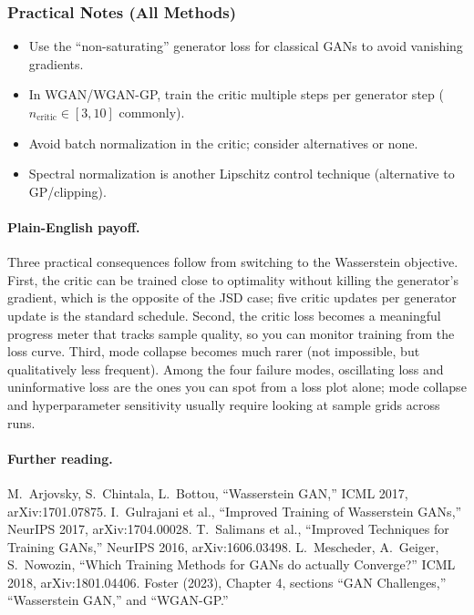 \documentclass[11pt]{article}
\theoremstyle{remark}
\begin{document}
\subsubsection{Practical Notes (All Methods)}
\begin{itemize}
\item Use the ``non-saturating'' generator loss for classical GANs to avoid vanishing gradients.
\item In WGAN/WGAN-GP, train the critic multiple steps per generator step ($n_{\text{critic}}\in[3,10]$ commonly).
\item Avoid batch normalization in the critic; consider alternatives or none.
\item Spectral normalization is another Lipschitz control technique (alternative to GP/clipping).
\end{itemize}

\paragraph{Plain-English payoff.}
Three practical consequences follow from switching to the Wasserstein objective. First, the critic can be trained close to optimality without killing the generator's gradient, which is the opposite of the JSD case; five critic updates per generator update is the standard schedule. Second, the critic loss becomes a meaningful progress meter that tracks sample quality, so you can monitor training from the loss curve. Third, mode collapse becomes much rarer (not impossible, but qualitatively less frequent). Among the four failure modes, oscillating loss and uninformative loss are the ones you can spot from a loss plot alone; mode collapse and hyperparameter sensitivity usually require looking at sample grids across runs.

\paragraph{Further reading.}\begingroup\sloppy
M.\ Arjovsky, S.\ Chintala, L.\ Bottou, ``Wasserstein GAN,'' ICML 2017, arXiv:1701.07875. I.\ Gulrajani et al., ``Improved Training of Wasserstein GANs,'' NeurIPS 2017, arXiv:1704.00028. T.\ Salimans et al., ``Improved Techniques for Training GANs,'' NeurIPS 2016, arXiv:1606.03498. L.\ Mescheder, A.\ Geiger, S.\ Nowozin, ``Which Training Methods for GANs do actually Converge?'' ICML 2018, arXiv:1801.04406. Foster (2023), Chapter 4, sections ``GAN Challenges,'' ``Wasserstein GAN,'' and ``WGAN-GP.''
\endgroup
\end{document}
